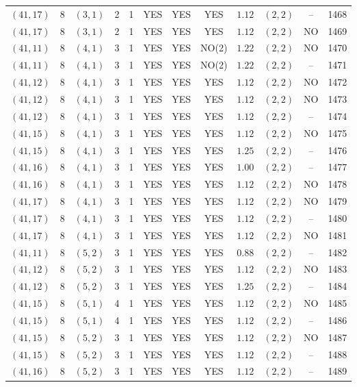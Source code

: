 \begin{longtable}{|c|c|c|c|c|c|c|c|c|c|c|c|}
$(41,17)$ & 8 & $(3,1)$ & 2 & 1 & YES & YES & YES & $1.12$ & $(2,2)$ & -- & 1468\\
$(41,17)$ & 8 & $(3,1)$ & 2 & 1 & YES & YES & YES & $1.12$ & $(2,2)$ & NO & 1469\\
$(41,11)$ & 8 & $(4,1)$ & 3 & 1 & YES & YES & NO(2) & $1.22$ & $(2,2)$ & NO & 1470\\
$(41,11)$ & 8 & $(4,1)$ & 3 & 1 & YES & YES & NO(2) & $1.22$ & $(2,2)$ & -- & 1471\\
$(41,12)$ & 8 & $(4,1)$ & 3 & 1 & YES & YES & YES & $1.12$ & $(2,2)$ & NO & 1472\\
$(41,12)$ & 8 & $(4,1)$ & 3 & 1 & YES & YES & YES & $1.12$ & $(2,2)$ & NO & 1473\\
$(41,12)$ & 8 & $(4,1)$ & 3 & 1 & YES & YES & YES & $1.12$ & $(2,2)$ & -- & 1474\\
$(41,15)$ & 8 & $(4,1)$ & 3 & 1 & YES & YES & YES & $1.12$ & $(2,2)$ & NO & 1475\\
$(41,15)$ & 8 & $(4,1)$ & 3 & 1 & YES & YES & YES & $1.25$ & $(2,2)$ & -- & 1476\\
$(41,16)$ & 8 & $(4,1)$ & 3 & 1 & YES & YES & YES & $1.00$ & $(2,2)$ & -- & 1477\\
$(41,16)$ & 8 & $(4,1)$ & 3 & 1 & YES & YES & YES & $1.12$ & $(2,2)$ & NO & 1478\\
$(41,17)$ & 8 & $(4,1)$ & 3 & 1 & YES & YES & YES & $1.12$ & $(2,2)$ & NO & 1479\\
$(41,17)$ & 8 & $(4,1)$ & 3 & 1 & YES & YES & YES & $1.12$ & $(2,2)$ & -- & 1480\\
$(41,17)$ & 8 & $(4,1)$ & 3 & 1 & YES & YES & YES & $1.12$ & $(2,2)$ & NO & 1481\\
$(41,11)$ & 8 & $(5,2)$ & 3 & 1 & YES & YES & YES & $0.88$ & $(2,2)$ & -- & 1482\\
$(41,12)$ & 8 & $(5,2)$ & 3 & 1 & YES & YES & YES & $1.12$ & $(2,2)$ & NO & 1483\\
$(41,12)$ & 8 & $(5,2)$ & 3 & 1 & YES & YES & YES & $1.25$ & $(2,2)$ & -- & 1484\\
$(41,15)$ & 8 & $(5,1)$ & 4 & 1 & YES & YES & YES & $1.12$ & $(2,2)$ & NO & 1485\\
$(41,15)$ & 8 & $(5,1)$ & 4 & 1 & YES & YES & YES & $1.12$ & $(2,2)$ & -- & 1486\\
$(41,15)$ & 8 & $(5,2)$ & 3 & 1 & YES & YES & YES & $1.12$ & $(2,2)$ & NO & 1487\\
$(41,15)$ & 8 & $(5,2)$ & 3 & 1 & YES & YES & YES & $1.12$ & $(2,2)$ & -- & 1488\\
$(41,16)$ & 8 & $(5,2)$ & 3 & 1 & YES & YES & YES & $1.12$ & $(2,2)$ & -- & 1489\\

\end{longtable}
